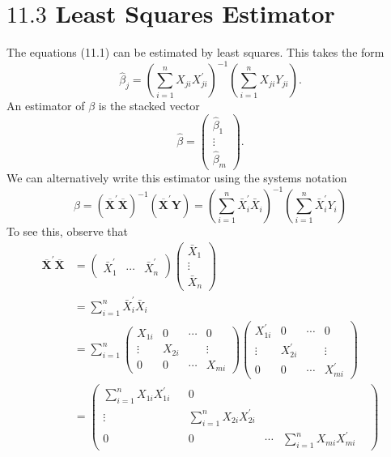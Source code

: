 \documentclass[10pt]{article}
\begin{document}
\section{$11.3$ Least Squares Estimator}
The equations (11.1) can be estimated by least squares. This takes the form
$$
\widehat{\beta}_{j}=\left(\sum_{i=1}^{n} X_{j i} X_{j i}^{\prime}\right)^{-1}\left(\sum_{i=1}^{n} X_{j i} Y_{j i}\right) .
$$
An estimator of $\beta$ is the stacked vector
$$
\widehat{\beta}=\left(\begin{array}{c}
\widehat{\beta}_{1} \\
\vdots \\
\widehat{\beta}_{m}
\end{array}\right) .
$$
We can alternatively write this estimator using the systems notation
$$
\widehat{\beta}=\left(\overline{\boldsymbol{X}}^{\prime} \overline{\boldsymbol{X}}\right)^{-1}\left(\overline{\boldsymbol{X}}^{\prime} \boldsymbol{Y}\right)=\left(\sum_{i=1}^{n} \bar{X}_{i}^{\prime} \bar{X}_{i}\right)^{-1}\left(\sum_{i=1}^{n} \bar{X}_{i}^{\prime} Y_{i}\right)
$$
To see this, observe that
$$
\begin{aligned}
\overline{\boldsymbol{X}}^{\prime} \overline{\boldsymbol{X}} &=\left(\begin{array}{ccc}
\bar{X}_{1}^{\prime} & \cdots & \bar{X}_{n}^{\prime}
\end{array}\right)\left(\begin{array}{c}
\bar{X}_{1} \\
\vdots \\
\bar{X}_{n}
\end{array}\right) \\
&=\sum_{i=1}^{n} \bar{X}_{i}^{\prime} \bar{X}_{i} \\
&=\sum_{i=1}^{n}\left(\begin{array}{cccc}
X_{1 i} & 0 & \cdots & 0 \\
\vdots & X_{2 i} & & \vdots \\
0 & 0 & \cdots & X_{m i}
\end{array}\right)\left(\begin{array}{ccccc}
X_{1 i}^{\prime} & 0 & \cdots & 0 \\
\vdots & X_{2 i}^{\prime} & & \vdots \\
0 & 0 & \cdots & X_{m i}^{\prime}
\end{array}\right) \\
&=\left(\begin{array}{cccccc}
\sum_{i=1}^{n} X_{1 i} X_{1 i}^{\prime} & & 0 \\
\vdots & & \sum_{i=1}^{n} X_{2 i} X_{2 i}^{\prime} & & & \\
0 & & 0 & \cdots & \sum_{i=1}^{n} X_{m i} X_{m i}^{\prime}
\end{array}\right)
\end{aligned}
$$
\end{document}
